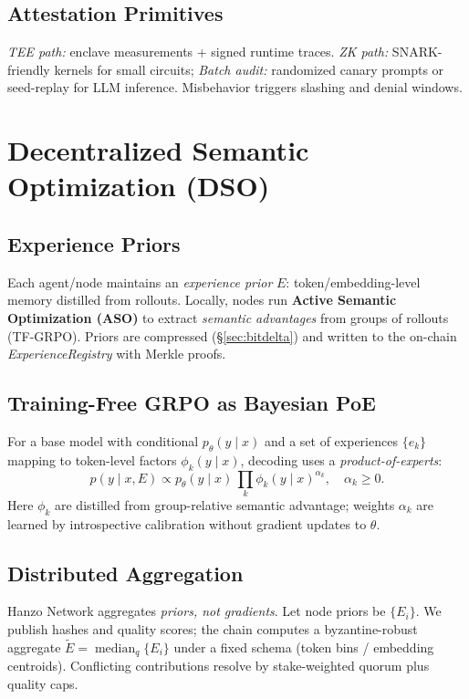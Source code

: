 \documentclass[11pt]{article}
\begin{document}
\subsection{Attestation Primitives}
\emph{TEE path:} enclave measurements + signed runtime traces. \emph{ZK path:} SNARK-friendly kernels for small circuits; \emph{Batch audit:} randomized canary prompts or seed-replay for LLM inference. Misbehavior triggers slashing and denial windows.

\section{Decentralized Semantic Optimization (DSO)}
\subsection{Experience Priors}
Each agent/node maintains an \emph{experience prior} \(E\): token/embedding-level memory distilled from rollouts. Locally, nodes run \textbf{Active Semantic Optimization (ASO)} to extract \emph{semantic advantages} from groups of rollouts (TF-GRPO). Priors are compressed (\S\ref{sec:bitdelta}) and written to the on-chain \emph{ExperienceRegistry} with Merkle proofs.

\subsection{Training-Free GRPO as Bayesian PoE}
For a base model with conditional \(p_\theta(y\mid x)\) and a set of experiences \(\{e_k\}\) mapping to token-level factors \(\phi_k(y\mid x)\), decoding uses a \emph{product-of-experts}:
\begin{equation}\label{eq:poe}
 p(y\mid x,E) \propto p_\theta(y\mid x)\,\prod_{k} \phi_k(y\mid x)^{\alpha_k},\quad \alpha_k\ge 0.
\end{equation}
Here \(\phi_k\) are distilled from group-relative semantic advantage; weights \(\alpha_k\) are learned by introspective calibration without gradient updates to \(\theta\).

\subsection{Distributed Aggregation}
Hanzo Network aggregates \emph{priors, not gradients}. Let node priors be \(\{E_i\}\). We publish hashes and quality scores; the chain computes a byzantine-robust aggregate \(\tilde E = \operatorname{median}_q\{E_i\}\) under a fixed schema (token bins / embedding centroids). Conflicting contributions resolve by stake-weighted quorum plus quality caps.
\end{document}
